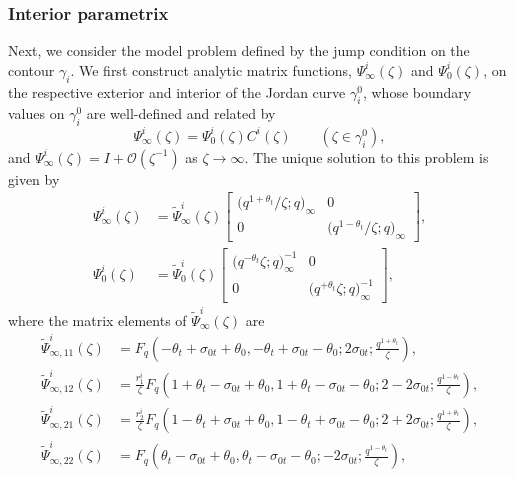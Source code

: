 \documentclass[a4paper,reqno,11pt]{amsart}
\numberwithin{equation}{section}
\numberwithin{figure}{section}
\theoremstyle{plain}
\theoremstyle{remark}
\numberwithin{rhp}{section}
\begin{document}
\subsubsection{Interior parametrix}\label{subsub:interior-param}
Next, we consider the model problem defined by the jump condition on the contour $\gamma_i$. We first construct analytic matrix functions, $\Psi_\infty^i(\zeta)$ and $\Psi_0^i(\zeta)$, on the respective exterior and interior of the Jordan curve $\gamma_i^0$, whose boundary values on $\gamma_i^0$ are well-defined and related by
\begin{equation*}
   \Psi_\infty^i(\zeta)= \Psi_0^i(\zeta)C^i(\zeta)\qquad (\zeta\in \gamma_i^0),
\end{equation*}
and $\Psi_\infty^i(\zeta)=I+\mathcal{O}(\zeta^{-1})$ as $\zeta\rightarrow \infty$.
The unique solution to this problem is given by
\begin{align}
    \Psi_\infty^i(\zeta)&=\widetilde{\Psi}_\infty^i(\zeta) \begin{bmatrix} \big(q^{1+\theta_t}/\zeta;q\big)_\infty & 0\\
    0 & \big(q^{1-\theta_t}/\zeta;q\big)_\infty
    \end{bmatrix},\label{eq:internalpsiinf}\\    \Psi_0^i(\zeta)&=\widetilde{\Psi}_0^i(\zeta)\begin{bmatrix} \big(q^{-\theta_t}\zeta;q\big)_\infty^{-1} & 0\\
    0 & \big(q^{+\theta_t}\zeta;q\big)_\infty^{-1}
    \end{bmatrix},\nonumber
\end{align}
where the matrix elements of $\widetilde{\Psi}_{\infty}^i(\zeta)$ are
\begin{equation}
\begin{split}
\widetilde{\Psi}_{\infty,{11}}^i(\zeta)&=F_q\left(-\theta_t+\sigma_{0t}+\theta_0,-\theta_t+\sigma_{0t}-\theta_0;2 \sigma_{0t};
\frac{q^{1+\theta_t}}{\zeta}\right),\\
\widetilde{\Psi}_{\infty,{12}}^i(\zeta)&=\frac{r_1^i}{\zeta}F_q\left(1+\theta_t-\sigma_{0t}+\theta_0,1+\theta_t-\sigma_{0t}-\theta_0;2-2\sigma_{0t};
\frac{q^{1-\theta_t}}{\zeta}\right),\\
\widetilde{\Psi}_{\infty,{21}}^i(\zeta)&=\frac{r_2^i}{\zeta}F_q\left(1-\theta_t+\sigma_{0t}+\theta_0,1-\theta_t+\sigma_{0t}-\theta_0;2+2\sigma_{0t};
\frac{q^{1+\theta_t}}{\zeta}\right),\\
\widetilde{\Psi}_{\infty,{22}}^i(\zeta)&=F_q\left(\theta_t-\sigma_{0t}+\theta_0,\theta_t-\sigma_{0t}-\theta_0;-2\sigma_{0t};
\frac{q^{1-\theta_t}}{\zeta}\right),
\end{split}\label{exp:Psihatinfi}
\end{equation}
\end{document}
